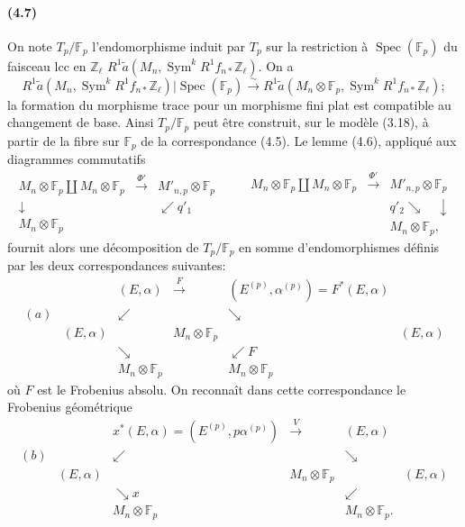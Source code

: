 \documentclass[10pt]{article}
\newcommand{\F}{\mathbb F}
\newcommand{\Z}{\mathbb Z}
\newcommand{\Spec}{\operatorname{Spec}}
\newcommand{\Sym}{\operatorname{Sym}}
\begin{document}
\paragraph{(4.7)}
On note $T_p/\F_p$ l'endomorphisme induit par $T_p$ sur la restriction à $\Spec(\F_p)$ du faisceau lcc en $\Z_\ell$ $R^1\widetilde a(M_n,\Sym^kR^1f_{n*}\Z_\ell)$. On a
\[
R^1\widetilde a(M_n,\Sym^kR^1f_{n*}\Z_\ell)|\Spec(\F_p)
\xrightarrow{\sim}
R^1\widetilde a(M_n\otimes\F_p,\Sym^kR^1f_{n*}\Z_\ell);
\]
la formation du morphisme trace pour un morphisme fini plat est compatible au changement de base. Ainsi $T_p/\F_p$ peut être construit, sur le modèle (3.18), à partir de la fibre sur $\F_p$ de la correspondance (4.5). Le lemme (4.6), appliqué aux diagrammes commutatifs
\[
\begin{array}{ccc}
M_n\otimes\F_p\coprod M_n\otimes\F_p&\xrightarrow{\Phi'}&M'_{n,p}\otimes\F_p\\
\downarrow&&\swarrow q'_1\\
M_n\otimes\F_p&&
\end{array}
\qquad
\begin{array}{ccc}
M_n\otimes\F_p\coprod M_n\otimes\F_p&\xrightarrow{\Phi'}&M'_{n,p}\otimes\F_p\\
&&q'_2\searrow\quad\downarrow\\
&&M_n\otimes\F_p,
\end{array}
\]
fournit alors une décomposition de $T_p/\F_p$ en somme d'endomorphismes définis par les deux correspondances suivantes:
\[
\begin{array}{cccccc}
&& (E,\alpha)&\xrightarrow{F}&(E^{(p)},\alpha^{(p)})=F^*(E,\alpha)\\[-0.2em]
(a)&& \swarrow && \searrow\\[-0.2em]
& (E,\alpha) && M_n\otimes\F_p && (E,\alpha)\\[-0.2em]
&& \searrow && \swarrow F\\[-0.2em]
&& M_n\otimes\F_p && M_n\otimes\F_p
\end{array}
\]
où $F$ est le Frobenius absolu. On reconnaît dans cette correspondance le Frobenius géométrique
\[
\begin{array}{cccccc}
&&x^*(E,\alpha)=(E^{(p)},p\alpha^{(p)})&\xrightarrow{\ V\ }&(E,\alpha)\\[-0.2em]
(b)&& \swarrow && \searrow\\[-0.2em]
& (E,\alpha) && M_n\otimes\F_p && (E,\alpha)\\[-0.2em]
&& \searrow x && \swarrow\\[-0.2em]
&& M_n\otimes\F_p && M_n\otimes\F_p.
\end{array}
\]
\end{document}
